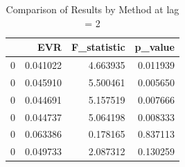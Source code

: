 \begin{table}
\caption{Comparison of Results by Method at lag = 2}
\label{tab:results_by_method}
\begin{tabular}{lrrr}
\toprule
 & EVR & F\_statistic & p\_value \\
\midrule
0 & 0.041022 & 4.663935 & 0.011939 \\
0 & 0.045910 & 5.500461 & 0.005650 \\
0 & 0.044691 & 5.157519 & 0.007666 \\
0 & 0.044737 & 5.064198 & 0.008333 \\
0 & 0.063386 & 0.178165 & 0.837113 \\
0 & 0.049733 & 2.087312 & 0.130259 \\
\bottomrule
\end{tabular}
\end{table}
